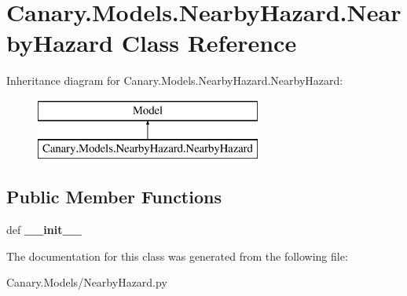 \hypertarget{class_canary_8_models_1_1_nearby_hazard_1_1_nearby_hazard}{\section{Canary.\-Models.\-Nearby\-Hazard.\-Nearby\-Hazard Class Reference}
\label{class_canary_8_models_1_1_nearby_hazard_1_1_nearby_hazard}
}
Inheritance diagram for Canary.\-Models.\-Nearby\-Hazard.\-Nearby\-Hazard\-:\begin{figure}[H]
\begin{center}
\leavevmode
\includegraphics[height=2.000000cm]{class_canary_8_models_1_1_nearby_hazard_1_1_nearby_hazard}
\end{center}
\end{figure}
\subsection*{Public Member Functions}
\begin{DoxyCompactItemize}
\item 
\hypertarget{class_canary_8_models_1_1_nearby_hazard_1_1_nearby_hazard_a70fe866a77324b53f7612c9a0420f3cf}{def {\bfseries \-\_\-\-\_\-init\-\_\-\-\_\-}}\label{class_canary_8_models_1_1_nearby_hazard_1_1_nearby_hazard_a70fe866a77324b53f7612c9a0420f3cf}

\end{DoxyCompactItemize}


The documentation for this class was generated from the following file\-:\begin{DoxyCompactItemize}
\item 
Canary.\-Models/Nearby\-Hazard.\-py\end{DoxyCompactItemize}

